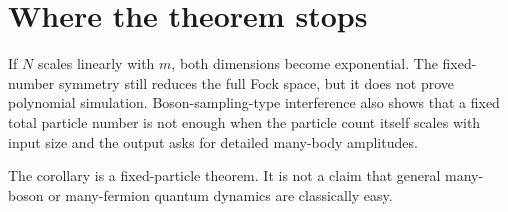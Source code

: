 \section{Where the theorem stops}
If $N$ scales linearly with $m$, both dimensions become exponential. The fixed-number symmetry still reduces the full Fock space, but it does not prove polynomial simulation. Boson-sampling-type interference also shows that a fixed total particle number is not enough when the particle count itself scales with input size and the output asks for detailed many-body amplitudes.

\begin{scopebox}
The corollary is a fixed-particle theorem. It is not a claim that general many-boson or many-fermion quantum dynamics are classically easy.
\end{scopebox}
